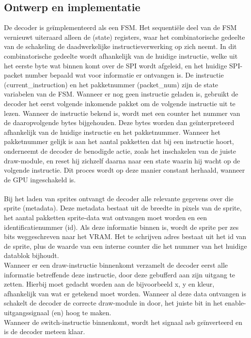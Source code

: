 \documentclass{scrartcl} %
\begin{document}
\subsection{Ontwerp en implementatie}
De decoder is geïmplementeerd als een FSM. Het sequentiële deel van de FSM vernieuwt uiteraard alleen de (state) registers, waar het combinatorische gedeelte van de schakeling de daadwerkelijke instructieverwerking op zich neemt. In dit combinatorische gedeelte wordt afhankelijk van de huidige instructie, welke uit het eerste byte wat binnen komt over de SPI wordt afgeleid, en het huidige SPI-packet number bepaald wat voor informatie er ontvangen is. De instructie (current\_instruction) en het pakketnummer (packet\_num) zijn de state variabelen van de FSM. Wanneer er nog geen instructie geladen is, gebruikt de decoder het eerst volgende inkomende pakket om de volgende instructie uit te lezen. Wanneer de instructie bekend is, wordt met een counter het nummer van de daaropvolgende bytes bijgehouden. Deze bytes worden dan geïnterpreteerd afhankelijk van de huidige instructie en het pakketnummer. Wanneer het pakketnummer gelijk is aan het aantal pakketten dat bij een instructie hoort, onderneemt de decoder de benodigde actie, zoals het inschakelen van de juiste draw-module, en reset hij zichzelf daarna naar een state waarin hij wacht op de volgende instructie. Dit proces wordt op deze manier constant herhaald, wanneer de GPU ingeschakeld is.
\\\\
Bij het laden van sprites ontvangt de decoder alle relevante gegevens over die sprite (metadata). Deze metadata bestaat uit de breedte in pixels van de sprite, het aantal pakketten sprite-data wat ontvangen moet worden en een identificatienummer (id). Als deze informatie binnen is, wordt de sprite per zes bits weggeschreven naar het VRAM. Het te schrijven adres bestaat uit het id van de sprite, plus de waarde van een interne counter die het nummer van het huidige datablok bijhoudt.
\\
Wanneer er een draw-instructie binnenkomt verzamelt de decoder eerst alle informatie betreffende deze instructie, door deze gebufferd aan zijn uitgang te zetten. Hierbij moet gedacht worden aan de bijvoorbeeld x, y en kleur, afhankelijk van wat er getekend moet worden. Wanneer al deze data ontvangen is schakelt de decoder de correcte draw-module in door, het juiste bit in het enable-uitgangssignaal (en) hoog te maken.
\\
Wanneer de switch-instructie binnenkomt, wordt het signaal asb geïnverteerd en is de decoder meteen klaar.
\end{document}
